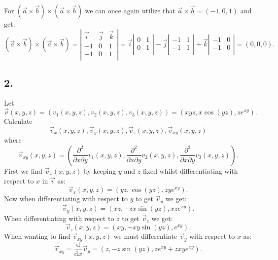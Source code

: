 For $\left( \Vec{a}\times \Vec{b} \right) \times \left( \Vec{a} \times \Vec{b} \right) $ we can once again utilize that $\Vec{a} \times \Vec{b} = \left( -1, 0, 1 \right) $ and get:
\[ 
  \left( \Vec{a} \times \Vec{b} \right)  \times \left( \Vec{a} \times \Vec{b} \right) = \left| \begin{array}{ccc}
  \Vec{i} & \Vec{j} & \Vec{k}\\
  -1 & 0 & 1\\
  -1 & 0 & 1\\
  \end{array} \right| = \Vec{i} \left| \begin{array}{cc}
  0 & 1\\
  0 & 1\\
  \end{array} \right| - \Vec{j} \left| \begin{array}{cc}
  -1 & 1\\
  -1 & 1\\
  \end{array} \right| + \Vec{k} \left| \begin{array}{cc}
  -1 & 0\\
  -1 & 0\\
  \end{array} \right| = \left( 0, 0, 0 \right)
.\]



\subsection*{2.} Let
\[ 
\Vec{v} \left( x,y,z \right) = \left( v_1 \left( x,y,z \right), v_2 \left( x,y,z \right), v_3 \left( x,y,z \right)  \right) = \left( xyz, x \cos \left( yz \right) , z e^{xy} \right) 
.\]
Calculate
\[ 
\Vec{v}_x \left( x,y,z \right), \Vec{v}_y \left( x,y,z \right), \Vec{v}_z \left( x,y,z \right), \Vec{v}_{xy} \left( x,y,z \right)
\]
where
\[ 
\Vec{v}_{xy} \left( x,y,z \right) = \left( \frac{\partial^2}{\partial x \partial y} v_1 \left( x,y,z \right), \frac{\partial^2}{\partial x \partial y} v_2 \left( x,y,z \right), \frac{\partial^2}{\partial x \partial y} v_3 \left( x,y,z \right) \right) 
.\]
\bigbreak
First we find $\Vec{v}_x \left( x, y, z \right) $ by keeping $y$ and $z$ fixed whilst differentiating with respect to $x$ in $\Vec{v}$ as:
\[ 
\Vec{v}_x \left( x, y, z \right) = \left( yz, \cos \left( yz \right), zy e^{xy} \right) 
.\]
Now when differentiating with respect to $y$ to get $\Vec{v}_y$ we get:
\[ 
\Vec{v}_y \left( x,y, z \right) = \left( xz, -zx \sin \left( yz \right), xz e^{xy} \right) 
.\]
When differentiating with respect to $z$ to get $\Vec{v}_z$ we get:
\[ 
\Vec{v}_z \left( x, y, z \right) = \left( xy, -xy \sin \left( yz \right), e^{xy}  \right) 
.\]
When wanting to find $\Vec{v}_{xy} \left( x,y,z \right) $ we must differentiate $\Vec{v}_y$ with respect to $x$ as:
\[ 
\Vec{v}_{xy} = \frac{\mathrm{d}}{\mathrm{d}x} \Vec{v}_y = \left( z, -z \sin \left( yz \right) , z e^{xy} + zxy e^{xy} \right) 
.\]





